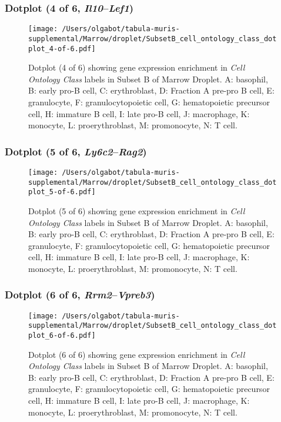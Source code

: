 \clearpage

\subsubsection{Dotplot (4 of 6, \emph{Il10}--\emph{Lef1})}
\begin{figure}[h]
\centering
\texttt{[image: /Users/olgabot/tabula-muris-supplemental/Marrow/droplet/SubsetB\_cell\_ontology\_class\_dotplot\_4-of-6.pdf]}

\caption{ Dotplot (4 of 6)  showing gene expression enrichment in \emph{Cell Ontology Class} labels in Subset B of Marrow Droplet. A: basophil, B: early pro-B cell, C: erythroblast, D: Fraction A pre-pro B cell, E: granulocyte, F: granulocytopoietic cell, G: hematopoietic precursor cell, H: immature B cell, I: late pro-B cell, J: macrophage, K: monocyte, L: proerythroblast, M: promonocyte, N: T cell.}
\end{figure}


\clearpage

\subsubsection{Dotplot (5 of 6, \emph{Ly6c2}--\emph{Rag2})}
\begin{figure}[h]
\centering
\texttt{[image: /Users/olgabot/tabula-muris-supplemental/Marrow/droplet/SubsetB\_cell\_ontology\_class\_dotplot\_5-of-6.pdf]}

\caption{ Dotplot (5 of 6)  showing gene expression enrichment in \emph{Cell Ontology Class} labels in Subset B of Marrow Droplet. A: basophil, B: early pro-B cell, C: erythroblast, D: Fraction A pre-pro B cell, E: granulocyte, F: granulocytopoietic cell, G: hematopoietic precursor cell, H: immature B cell, I: late pro-B cell, J: macrophage, K: monocyte, L: proerythroblast, M: promonocyte, N: T cell.}
\end{figure}


\clearpage

\subsubsection{Dotplot (6 of 6, \emph{Rrm2}--\emph{Vpreb3})}
\begin{figure}[h]
\centering
\texttt{[image: /Users/olgabot/tabula-muris-supplemental/Marrow/droplet/SubsetB\_cell\_ontology\_class\_dotplot\_6-of-6.pdf]}

\caption{ Dotplot (6 of 6)  showing gene expression enrichment in \emph{Cell Ontology Class} labels in Subset B of Marrow Droplet. A: basophil, B: early pro-B cell, C: erythroblast, D: Fraction A pre-pro B cell, E: granulocyte, F: granulocytopoietic cell, G: hematopoietic precursor cell, H: immature B cell, I: late pro-B cell, J: macrophage, K: monocyte, L: proerythroblast, M: promonocyte, N: T cell.}
\end{figure}


